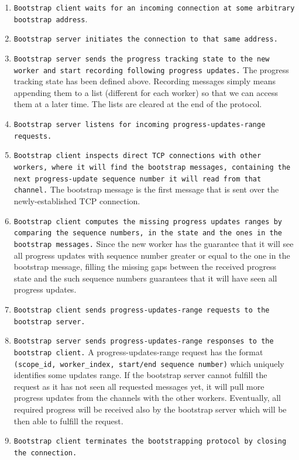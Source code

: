 \documentclass[12pt]{extarticle}
\begin{document}
\begin{enumerate}
    \item \texttt{Bootstrap client waits for an incoming connection at some arbitrary bootstrap address}.

    \item \texttt{Bootstrap server initiates the connection to that same address.}

    \item \texttt{Bootstrap server sends the progress tracking state to the new worker and start recording following progress updates.}
        The progress tracking state has been defined above. Recording messages simply means appending them to a list (different for each worker)
        so that we can access them at a later time. The lists are cleared at the end of the protocol.

    \item \texttt{Bootstrap server listens for incoming progress-updates-range requests.}

    \item \texttt{Bootstrap client inspects direct TCP connections with other workers, where it will find the bootstrap messages, containing the next progress-update sequence number it will read from that channel.}
        The bootstrap message is the first message that is sent over the newly-established TCP connection.

    \item \texttt{Bootstrap client computes the missing progress updates ranges by comparing the sequence numbers, in the state and the ones in the bootstrap messages.}
        Since the new worker has the guarantee that it will see all progress updates with sequence number greater or equal to the one in the bootstrap
        message, filling the missing gaps between the received progress state and the such sequence numbers guarantees that it will have seen all
        progress updates.

    \item \texttt{Bootstrap client sends progress-updates-range requests to the bootstrap server.}

    \item \texttt{Bootstrap server sends progress-updates-range responses to the bootstrap client.}
        A progress-updates-range request has the format \texttt{(scope\_id, worker\_index, start/end sequence number)}
        which uniquely identifies some updates range. If the bootstrap server cannot fulfill the request
        as it has not seen all requested messages yet, it will pull more progress updates from the channels with the other workers.
        Eventually, all required progress will be received also by the bootstrap server which
        will be then able to fulfill the request.

    \item \texttt{Bootstrap client terminates the bootstrapping protocol by closing the connection.}

\end{enumerate}
\end{document}
